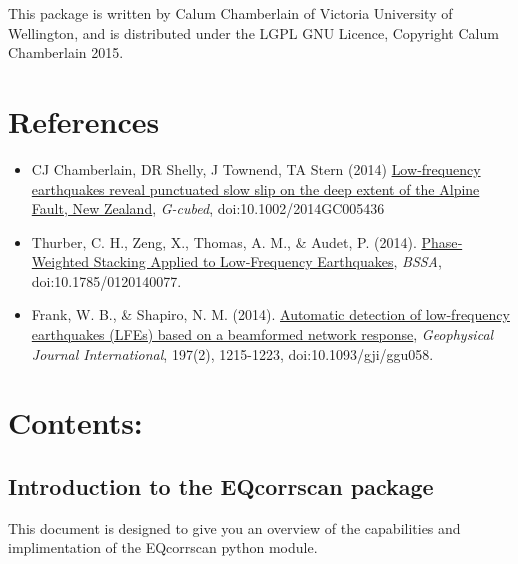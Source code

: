 \documentclass[a4paper,10pt,english]{sphinxmanual}
\begin{document}
This package is written by Calum Chamberlain of Victoria University of Wellington, and
is distributed under the LGPL GNU Licence, Copyright Calum Chamberlain 2015.


\chapter{References}
\label{index:references}\begin{itemize}
\item {} 
CJ Chamberlain, DR Shelly, J Townend, TA Stern (2014) \href{http://onlinelibrary.wiley.com/doi/10.1002/2014GC005436/full}{Low‐frequency earthquakes reveal punctuated slow slip on the deep extent of the Alpine Fault, New Zealand}, \emph{G-cubed}, doi:10.1002/2014GC005436

\item {} 
Thurber, C. H., Zeng, X., Thomas, A. M., \& Audet, P. (2014). \href{http://www.bssaonline.org/content/early/2014/08/12/0120140077.abstract}{Phase‐Weighted Stacking Applied to Low‐Frequency Earthquakes}, \emph{BSSA}, doi:10.1785/0120140077.

\item {} 
Frank, W. B., \& Shapiro, N. M. (2014). \href{http://gji.oxfordjournals.org/content/197/2/1215.short}{Automatic detection of low-frequency earthquakes (LFEs) based on a beamformed network response}, \emph{Geophysical Journal International}, 197(2), 1215-1223, doi:10.1093/gji/ggu058.

\end{itemize}


\chapter{Contents:}
\label{index:contents}

\section{Introduction to the EQcorrscan package}
\label{intro:introduction-to-the-eqcorrscan-package}\label{intro::doc}
This document is designed to give you an overview of the capabilities and
implimentation of the EQcorrscan python module.
\end{document}
